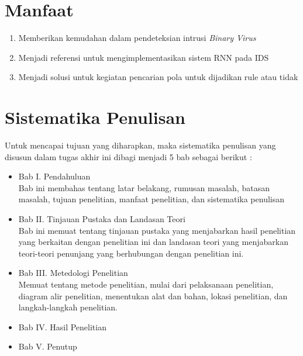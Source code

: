 \documentclass{report}
\begin{document}
\section{Manfaat}
\begin{enumerate}
    \item Memberikan kemudahan dalam pendeteksian intrusi \textit{Binary Virus}
    \item Menjadi referensi untuk mengimplementasikan sistem RNN pada IDS
    \item Menjadi solusi untuk kegiatan pencarian pola untuk dijadikan rule atau tidak
\end{enumerate}
\section{Sistematika Penulisan}
Untuk mencapai tujuan yang diharapkan, maka sistematika penulisan yang disusun dalam tugas akhir ini dibagi menjadi 5 bab sebagai berikut :
\begin{itemize}
    \item Bab I. Pendahuluan \\ Bab ini membahas tentang latar belakang, rumusan masalah, batasan masalah, tujuan penelitian, manfaat penelitian, dan sistematika penulisan
    \item Bab II. Tinjauan Pustaka dan Landasan Teori \\ Bab ini memuat tentang tinjauan pustaka yang menjabarkan hasil penelitian yang berkaitan dengan penelitian ini dan landasan teori yang menjabarkan teori-teori penunjang yang berhubungan dengan penelitian ini.
    \item Bab III. Metedologi Penelitian \\ Memuat tentang metode penelitian, mulai dari pelaksanaan penelitian, diagram alir penelitian, menentukan alat dan bahan, lokasi penelitian, dan langkah-langkah penelitian.
    \item Bab IV. Hasil Penelitian
    \item Bab V. Penutup
\end{itemize}
\end{document}
